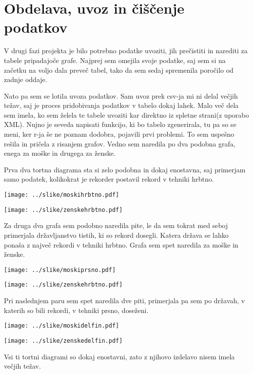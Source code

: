 \section{Obdelava, uvoz in čiščenje podatkov}

V drugi fazi projekta je bilo potrebno podatke uvoziti, jih prečistiti in narediti za tabele pripadajoče grafe. Najprej sem omejila svoje podatke, saj sem si na začetku na voljo dala preveč tabel, tako da sem sedaj spremenila poročilo od zadnje oddaje.

Nato pa sem se lotila uvoza podatkov. Sam uvoz prek csv-ja mi ni delal večjih težav, saj je proces pridobivanja podatkov v tabelo dokaj lahek. Malo več dela sem imela, ko sem želela te tabele uvoziti kar direktno iz spletne strani(z uporabo XML). Nujno je seveda napisati funkcijo, ki bo tabelo zgenerirala, tu pa so se meni, ker r-ja še ne poznam dodobra, pojavili prvi problemi. To sem uspešno rešila in pričela z risanjem grafov. Vedno sem naredila po dva podobna grafa, enega za moške in drugega za ženske.

Prva dva tortna diagrama sta si zelo podobna in dokaj enostavna, saj primerjam samo podatek, kolikokrat je rekorder postavil rekord v tehniki hrbtno. 

\texttt{[image: ../slike/moskihrbtno.pdf]}

\texttt{[image: ../slike/zenskehrbtno.pdf]}

Za druga dva grafa sem podobno naredila pite, le da sem tokrat med seboj primerjala državljanstvo tistih, ki so rekord dosegli. Katera država se lahko ponaša z največ rekordi v tehniki hrbtno. Grafa sem spet naredila za moške in ženske.

\texttt{[image: ../slike/moskiprsno.pdf]}

\texttt{[image: ../slike/zenskehrbtno.pdf]}

Pri naslednjem paru sem spet naredila dve piti, primerjala pa sem po državah, v katerih so bili rekordi, v tehniki prsno, doseženi.

\texttt{[image: ../slike/moskidelfin.pdf]}

\texttt{[image: ../slike/zenskedelfin.pdf]}

Vsi ti tortni diagrami so dokaj enostavni, zato z njihovo izdelavo nisem imela večjih težav.




% 
% 
% 

